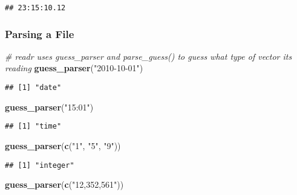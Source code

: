 \documentclass[]{article}
\newenvironment{Shaded}{\begin{snugshade}}{\end{snugshade}}
\newcommand{\KeywordTok}[1]{\textcolor[rgb]{0.13,0.29,0.53}{\textbf{#1}}}
\newcommand{\StringTok}[1]{\textcolor[rgb]{0.31,0.60,0.02}{#1}}
\newcommand{\CommentTok}[1]{\textcolor[rgb]{0.56,0.35,0.01}{\textit{#1}}}
\newcommand{\NormalTok}[1]{#1}
\begin{document}
\begin{Shaded}
\end{Shaded}

\begin{verbatim}
## 23:15:10.12
\end{verbatim}

\subsubsection{Parsing a File}\label{parsing-a-file}

\begin{Shaded}
\begin{Highlighting}[]
\CommentTok{# readr uses guess_parser and parse_guess() to guess what type of vector its reading }
\KeywordTok{guess_parser}\NormalTok{(}\StringTok{"2010-10-01"}\NormalTok{)}
\end{Highlighting}
\end{Shaded}

\begin{verbatim}
## [1] "date"
\end{verbatim}

\begin{Shaded}
\begin{Highlighting}[]
\KeywordTok{guess_parser}\NormalTok{(}\StringTok{"15:01"}\NormalTok{)}
\end{Highlighting}
\end{Shaded}

\begin{verbatim}
## [1] "time"
\end{verbatim}

\begin{Shaded}
\begin{Highlighting}[]
\KeywordTok{guess_parser}\NormalTok{(}\KeywordTok{c}\NormalTok{(}\StringTok{"1"}\NormalTok{, }\StringTok{"5"}\NormalTok{, }\StringTok{"9"}\NormalTok{))}
\end{Highlighting}
\end{Shaded}

\begin{verbatim}
## [1] "integer"
\end{verbatim}

\begin{Shaded}
\begin{Highlighting}[]
\KeywordTok{guess_parser}\NormalTok{(}\KeywordTok{c}\NormalTok{(}\StringTok{"12,352,561"}\NormalTok{))}
\end{Highlighting}
\end{Shaded}
\end{document}
